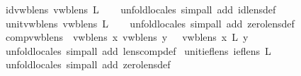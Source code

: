 \begin{isabellebody}
\endisatagproof
{\isafoldproof}%
%
\isadelimproof
\isanewline
%
\endisadelimproof
\isanewline
{}\isamarkupfalse%
\ id{\isacharunderscore}vwb{\isacharunderscore}lens{\isacharcolon}\ {\isachardoublequoteopen}vwb{\isacharunderscore}lens\ {}\isactrlsub L{\isachardoublequoteclose}\isanewline
%
\isadelimproof
\ \ %
\endisadelimproof
%
\isatagproof
{}\isamarkupfalse%
\ {\isacharparenleft}unfold{\isacharunderscore}locales{\isacharcomma}\ simp{\isacharunderscore}all\ add{\isacharcolon}\ id{\isacharunderscore}lens{\isacharunderscore}def{\isacharparenright}%
\endisatagproof
{\isafoldproof}%
%
\isadelimproof
\isanewline
%
\endisadelimproof
\isanewline
{}\isamarkupfalse%
\ unit{\isacharunderscore}vwb{\isacharunderscore}lens{\isacharcolon}\ {\isachardoublequoteopen}vwb{\isacharunderscore}lens\ {}\isactrlsub L{\isachardoublequoteclose}\isanewline
%
\isadelimproof
\ \ %
\endisadelimproof
%
\isatagproof
{}\isamarkupfalse%
\ {\isacharparenleft}unfold{\isacharunderscore}locales{\isacharcomma}\ simp{\isacharunderscore}all\ add{\isacharcolon}\ zero{\isacharunderscore}lens{\isacharunderscore}def{\isacharparenright}%
\endisatagproof
{\isafoldproof}%
%
\isadelimproof
\isanewline
%
\endisadelimproof
\isanewline
{}\isamarkupfalse%
\ comp{\isacharunderscore}vwb{\isacharunderscore}lens{\isacharcolon}\ {\isachardoublequoteopen}{\isasymlbrakk}\ vwb{\isacharunderscore}lens\ x{\isacharsemicolon}\ vwb{\isacharunderscore}lens\ y\ {\isasymrbrakk}\ {\isasymLongrightarrow}\ vwb{\isacharunderscore}lens\ {\isacharparenleft}x\ {\isacharsemicolon}\isactrlsub L\ y{\isacharparenright}{\isachardoublequoteclose}\isanewline
%
\isadelimproof
\ \ %
\endisadelimproof
%
\isatagproof
{}\isamarkupfalse%
\ {\isacharparenleft}unfold{\isacharunderscore}locales{\isacharcomma}\ simp{\isacharunderscore}all\ add{\isacharcolon}\ lens{\isacharunderscore}comp{\isacharunderscore}def{\isacharparenright}%
\endisatagproof
{\isafoldproof}%
%
\isadelimproof
\isanewline
%
\endisadelimproof
\isanewline
{}\isamarkupfalse%
\ unit{\isacharunderscore}ief{\isacharunderscore}lens{\isacharcolon}\ {\isachardoublequoteopen}ief{\isacharunderscore}lens\ {}\isactrlsub L{\isachardoublequoteclose}\isanewline
%
\isadelimproof
\ \ %
\endisadelimproof
%
\isatagproof
{}\isamarkupfalse%
\ {\isacharparenleft}unfold{\isacharunderscore}locales{\isacharcomma}\ simp{\isacharunderscore}all\ add{\isacharcolon}\ zero{\isacharunderscore}lens{\isacharunderscore}def{\isacharparenright}%
\endisatagproof

\end{isabellebody}
